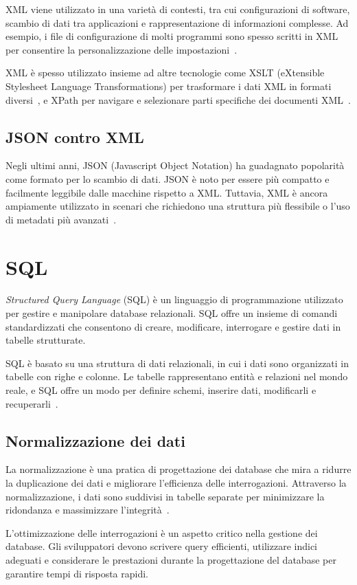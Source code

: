 XML viene utilizzato in una varietà di contesti, tra cui configurazioni di software, scambio di dati tra applicazioni e rappresentazione di informazioni complesse. Ad esempio, i file di configurazione di molti programmi sono spesso scritti in XML per consentire la personalizzazione delle impostazioni~\cite{XML, JSON_XML}.

XML è spesso utilizzato insieme ad altre tecnologie come XSLT (eXtensible Stylesheet Language Transformations) per trasformare i dati XML in formati diversi~\cite{XLST}, e XPath per navigare e selezionare parti specifiche dei documenti XML~\cite{XPATH}.

\subsection{JSON contro XML}
Negli ultimi anni, JSON (Javascript Object Notation) ha guadagnato popolarità come formato per lo scambio di dati. JSON è noto per essere più compatto e facilmente leggibile dalle macchine rispetto a XML. Tuttavia, XML è ancora ampiamente utilizzato in scenari che richiedono una struttura più flessibile o l'uso di metadati più avanzati~\cite{JSON_XML}.

\section{SQL}
\emph{Structured Query Language} (SQL) è un linguaggio di programmazione utilizzato per gestire e manipolare database relazionali. SQL offre un insieme di comandi standardizzati che consentono di creare, modificare, interrogare e gestire dati in tabelle strutturate.

SQL è basato su una struttura di dati relazionali, in cui i dati sono organizzati in tabelle con righe e colonne. Le tabelle rappresentano entità e relazioni nel mondo reale, e SQL offre un modo per definire schemi, inserire dati, modificarli e recuperarli~\cite{ALL_WEB}.

\subsection{Normalizzazione dei dati}
La normalizzazione è una pratica di progettazione dei database che mira a ridurre la duplicazione dei dati e migliorare l'efficienza delle interrogazioni. Attraverso la normalizzazione, i dati sono suddivisi in tabelle separate per minimizzare la ridondanza e massimizzare l'integrità~\cite{Normalizzazione}.

L'ottimizzazione delle interrogazioni è un aspetto critico nella gestione dei database. Gli sviluppatori devono scrivere query efficienti, utilizzare indici adeguati e considerare le prestazioni durante la progettazione del database per garantire tempi di risposta rapidi.

